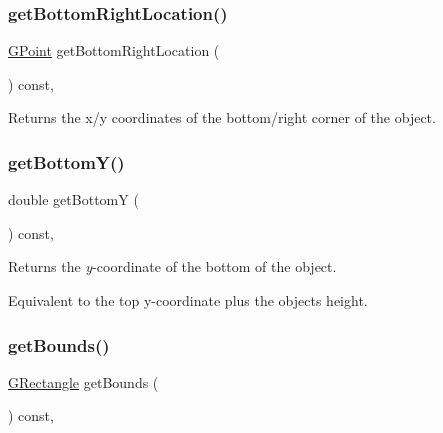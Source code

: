\mbox{\label{classsgl_1_1GObject_a0d41183bf6b08de66fe3907551aab0d7}} 
\subsubsection{\texorpdfstring{get\+Bottom\+Right\+Location()}{getBottomRightLocation()}}
{\footnotesize\ttfamily \mbox{\hyperlink{structsgl_1_1GPoint}{G\+Point}} get\+Bottom\+Right\+Location (\begin{DoxyParamCaption}{ }\end{DoxyParamCaption}) const\hspace{0.3cm}{\ttfamily [virtual]}, {\ttfamily [inherited]}}



Returns the x/y coordinates of the bottom/right corner of the object. 

\mbox{\label{classsgl_1_1GObject_a4316a2406c18e1c6d061fe51fd355490}} 
\subsubsection{\texorpdfstring{get\+Bottom\+Y()}{getBottomY()}}
{\footnotesize\ttfamily double get\+BottomY (\begin{DoxyParamCaption}{ }\end{DoxyParamCaption}) const\hspace{0.3cm}{\ttfamily [virtual]}, {\ttfamily [inherited]}}



Returns the {\itshape y}-\/coordinate of the bottom of the object. 

Equivalent to the top y-\/coordinate plus the object\textquotesingle{}s height. \mbox{\label{classsgl_1_1GText_a89040ce9277825772d359fccd33bca86}} 
\subsubsection{\texorpdfstring{get\+Bounds()}{getBounds()}}
{\footnotesize\ttfamily \mbox{\hyperlink{structsgl_1_1GRectangle}{G\+Rectangle}} get\+Bounds (\begin{DoxyParamCaption}{ }\end{DoxyParamCaption}) const\hspace{0.3cm}{\ttfamily [override]}, {\ttfamily [virtual]}}



